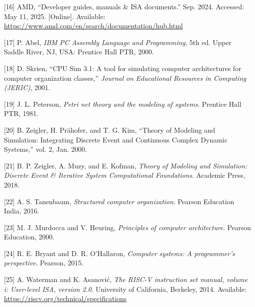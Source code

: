\documentclass[12pt,oneside]{templates/unerthesis}
\newcommand{\CSLLeftMargin}[1]{#1} %
\newcommand{\CSLRightInline}[1]{#1} %
\newlength{\cslhangindent}
\newenvironment{CSLReferences}[2] %
 {\setlength{\parindent}{0pt}%
  \setlength{\leftskip}{#1 pt\relax}%
  \setlength{\parskip}{#2 pt\relax}%
  \everypar{\setlength{\hangindent}{\cslhangindent}}}
 {\par}
\begin{document}
\begin{CSLReferences}{0}{0}
\leavevmode{}%
\CSLLeftMargin{{[}16{]} }%
\CSLRightInline{AMD, {``Developer guides, manuals \& ISA documents.''} Sep. 2024. Accessed: May 11, 2025. {[}Online{]}. Available: \url{https://www.amd.com/en/search/documentation/hub.html}}

\leavevmode{}%
\CSLLeftMargin{{[}17{]} }%
\CSLRightInline{P. Abel, \emph{{IBM} {PC} {Assembly} {Language} and {Programming}}, 5th ed. Upper Saddle River, NJ, USA: Prentice Hall PTR, 2000.}

\leavevmode{}%
\CSLLeftMargin{{[}18{]} }%
\CSLRightInline{D. Skrien, {``{CPU} {Sim} 3.1: {A} tool for simulating computer architectures for computer organization classes,''} \emph{Journal on Educational Resources in Computing (JERIC)}, 2001.}

\leavevmode{}%
\CSLLeftMargin{{[}19{]} }%
\CSLRightInline{J. L. Peterson, \emph{Petri net theory and the modeling of systems}. Prentice Hall PTR, 1981.}

\leavevmode{}%
\CSLLeftMargin{{[}20{]} }%
\CSLRightInline{B. Zeigler, H. Prähofer, and T. G. Kim, {``Theory of {Modeling} and {Simulation}: {Integrating} {Discrete} {Event} and {Continuous} {Complex} {Dynamic} {Systems},''} vol. 2, Jan. 2000.}

\leavevmode{}%
\CSLLeftMargin{{[}21{]} }%
\CSLRightInline{B. P. Zeigler, A. Muzy, and E. Kofman, \emph{Theory of {Modeling} and {Simulation}: {Discrete} {Event} \& {Iterative} {System} {Computational} {Foundations}}. Academic Press, 2018.}

\leavevmode{}%
\CSLLeftMargin{{[}22{]} }%
\CSLRightInline{A. S. Tanenbaum, \emph{Structured computer organization}. Pearson Education India, 2016.}

\leavevmode{}%
\CSLLeftMargin{{[}23{]} }%
\CSLRightInline{M. J. Murdocca and V. Heuring, \emph{Principles of computer architecture}. Pearson Education, 2000.}

\leavevmode{}%
\CSLLeftMargin{{[}24{]} }%
\CSLRightInline{R. E. Bryant and D. R. O'Hallaron, \emph{Computer systems: A programmer's perspective}. Pearson, 2015.}

\leavevmode{}%
\CSLLeftMargin{{[}25{]} }%
\CSLRightInline{A. Waterman and K. Asanović, \emph{The {RISC}-{V} instruction set manual, volume i: User-level ISA, version 2.0}. University of California, Berkeley, 2014. Available: \url{https://riscv.org/technical/specifications}}


\end{CSLReferences}
\end{document}
